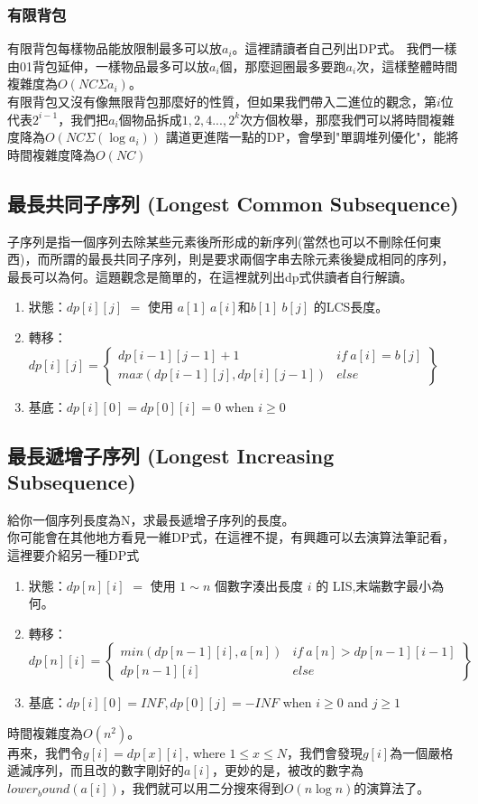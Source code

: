\subsubsection{有限背包}
有限背包每樣物品能放限制最多可以放$a_i$。這裡請讀者自己列出DP式。
我們一樣由01背包延伸，一樣物品最多可以放$a_i$個，那麼迴圈最多要跑$a_i$次，這樣整體時間複雜度為$O(NC\Sigma a_i)$。\\
有限背包又沒有像無限背包那麼好的性質，但如果我們帶入二進位的觀念，第$i$位代表$2^{i-1}$，我們把$a_i$個物品拆成$1,2,4...,2^k$次方個枚舉，那麼我們可以將時間複雜度降為$O(NC\Sigma(\log a_i))$
講道更進階一點的DP，會學到"單調堆列優化"，能將時間複雜度降為$O(NC)$
\subsection{最長共同子序列 (Longest Common Subsequence)}
子序列是指一個序列去除某些元素後所形成的新序列(當然也可以不刪除任何東西)，而所謂的最長共同子序列，則是要求兩個字串去除元素後變成相同的序列，最長可以為何。這題觀念是簡單的，在這裡就列出dp式供讀者自行解讀。
\begin{enumerate}
\item 狀態：$dp[i][j]$ $=$ 使用 $a[1]~a[i]$和$b[1]~b[j]$ 的LCS長度。
\item 轉移：$dp[i][j] =\left\{ \begin{array}{cc}
dp[i-1][j-1]+1 & if\ a[i]=b[j]\\
max(dp[i-1][j],dp[i][j-1]) & else
\end{array} \right\}$
\item 基底：$dp[i][0]=dp[0][i]=0$ when $i \geq 0$
\end{enumerate}
\subsection{最長遞增子序列 (Longest Increasing Subsequence)}
給你一個序列長度為N，求最長遞增子序列的長度。\\
你可能會在其他地方看見一維DP式，在這裡不提，有興趣可以去演算法筆記看，這裡要介紹另一種DP式
\begin{enumerate}
\item 狀態：$dp[n][i]$ $=$ 使用 $1 ∼ n$ 個數字湊出長度 $i$ 的 LIS,末端數字最小為何。
\item 轉移：$dp[n][i] =\left\{ \begin{array}{cc}
min(dp[n-1][i],a[n]) & if\ a[n]>dp[n-1][i-1]\\
dp[n-1][i] & else
\end{array} \right\}$
\item 基底：$dp[i][0] = INF, dp[0][j] = −INF$ when $i \geq 0$ and $j \geq 1$
\end{enumerate}
時間複雜度為$O(n^2)$。\\
再來，我們令$g[i]=dp[x][i]$, where $1\leq x \leq N$，我們會發現$g[i]$為一個嚴格遞減序列，而且改的數字剛好的$a[i]$，更妙的是，被改的數字為$lower_bound(a[i])$，我們就可以用二分搜來得到$O(n\log n)$的演算法了。
